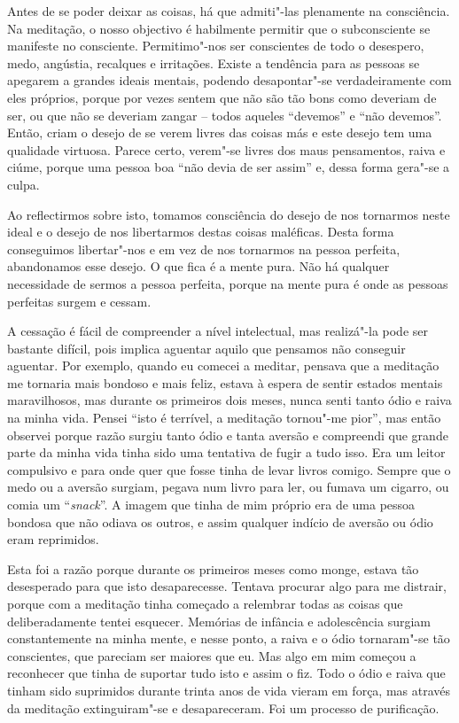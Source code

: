 Antes de se poder deixar as coisas, há que admiti"-las plenamente na consciência.
Na meditação, o nosso objectivo é habilmente permitir que o subconsciente se
manifeste no consciente. Permitimo"-nos ser conscientes de todo o desespero, medo, angústia, recalques e irritações. Existe a tendência para as
pessoas se apegarem a grandes ideais mentais, podendo desapontar"-se
verdadeiramente com eles próprios, porque por vezes sentem que não são tão bons
como deveriam de ser, ou que não se deveriam zangar -- todos aqueles “devemos” e “não
devemos”. Então, criam o desejo de se verem livres das coisas más e este desejo
tem uma qualidade virtuosa. Parece certo, verem"-se livres dos maus pensamentos,
raiva e ciúme, porque uma pessoa boa “não devia de ser assim” e, dessa forma
gera"-se a culpa.

Ao reflectirmos sobre isto, tomamos consciência do desejo de nos tornarmos neste
ideal e o desejo de nos libertarmos destas coisas maléficas. Desta forma conseguimos
libertar"-nos e em vez de nos tornarmos na pessoa perfeita, abandonamos esse
desejo. O que fica é a mente pura. Não há qualquer necessidade de sermos a
pessoa perfeita, porque na mente pura é onde as pessoas perfeitas surgem e
cessam.

A cessação é fácil de compreender a nível intelectual, mas realizá"-la pode ser
bastante difícil, pois implica aguentar aquilo que pensamos não conseguir aguentar. Por exemplo, quando eu comecei a meditar, pensava que a meditação me tornaria mais
bondoso e mais feliz, estava à espera de sentir estados mentais maravilhosos,
mas durante os primeiros dois meses, nunca senti tanto ódio e raiva na minha
vida. Pensei “isto é terrível, a meditação tornou"-me pior”, mas então observei
porque razão surgiu tanto ódio e tanta aversão e compreendi que grande parte da
minha vida tinha sido uma tentativa de fugir a tudo isso. Era um leitor
compulsivo e para onde quer que fosse tinha de levar livros comigo. Sempre que o
medo ou a aversão surgiam, pegava num livro para ler, ou fumava um cigarro, ou
comia um “\emph{snack}”. A imagem que tinha de mim próprio era de uma pessoa
bondosa que não odiava os outros, e assim qualquer indício de aversão ou ódio eram
reprimidos.

Esta foi a razão porque durante os primeiros meses como monge, estava tão
desesperado para que isto desaparecesse. Tentava procurar algo para me distrair,
porque com a meditação tinha começado a relembrar todas as coisas que
deliberadamente tentei esquecer. Memórias de infância e adolescência surgiam
constantemente na minha mente, e nesse ponto, a raiva e o ódio tornaram"-se tão
conscientes, que pareciam ser maiores que eu. Mas algo em mim começou a
reconhecer que tinha de suportar tudo isto e assim o fiz. Todo o ódio e raiva
que tinham sido suprimidos durante trinta anos de vida vieram em força, mas
através da meditação extinguiram"-se e desapareceram. Foi um processo de
purificação.

